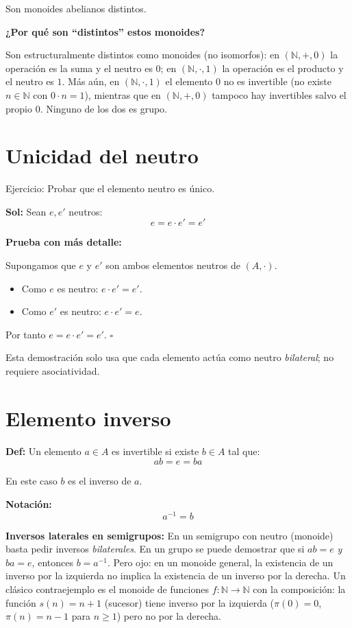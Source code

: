 \documentclass[12pt]{article}
\begin{document}
Son monoides abelianos distintos.

\begin{tcolorbox}[iabox]
\textbf{¿Por qué son ``distintos'' estos monoides?}

Son estructuralmente distintos como monoides (no isomorfos): en $(\mathbb{N},+,0)$ la operación es la suma y el neutro es $0$; en $(\mathbb{N},\cdot,1)$ la operación es el producto y el neutro es $1$. Más aún, en $(\mathbb{N},\cdot,1)$ el elemento $0$ no es invertible (no existe $n\in\mathbb{N}$ con $0\cdot n=1$), mientras que en $(\mathbb{N},+,0)$ tampoco hay invertibles salvo el propio $0$. Ninguno de los dos es grupo.
\end{tcolorbox}

\section*{Unicidad del neutro}

Ejercicio: Probar que el elemento neutro es único.

\textbf{Sol:}
Sean $e,e'$ neutros:
\[
e=e\cdot e'=e'
\]

\begin{tcolorbox}[iabox]
\textbf{Prueba con más detalle:}

Supongamos que $e$ y $e'$ son ambos elementos neutros de $(A,\cdot)$.
\begin{itemize}
  \item Como $e$ es neutro: $e \cdot e' = e'$.
  \item Como $e'$ es neutro: $e \cdot e' = e$.
\end{itemize}
Por tanto $e = e \cdot e' = e'$. \quad$\square$

Esta demostración solo usa que cada elemento actúa como neutro \emph{bilateral}; no requiere asociatividad.
\end{tcolorbox}

\section*{Elemento inverso}

\textbf{Def:} Un elemento $a\in A$ es invertible si existe $b\in A$ tal que:
\[
ab=e=ba
\]

En este caso $b$ es el inverso de $a$.

\textbf{Notación:}
\[
a^{-1}=b
\]

\begin{tcolorbox}[iabox]
\textbf{Inversos laterales en semigrupos:} En un semigrupo con neutro (monoide) basta pedir inversos \emph{bilaterales}. En un grupo se puede demostrar que si $ab=e$ \emph{y} $ba=e$, entonces $b=a^{-1}$. Pero ojo: en un monoide general, la existencia de un inverso por la izquierda no implica la existencia de un inverso por la derecha. Un clásico contraejemplo es el monoide de funciones $f:\mathbb{N}\to\mathbb{N}$ con la composición: la función $s(n)=n+1$ (sucesor) tiene inverso por la izquierda ($\pi(0)=0$, $\pi(n)=n-1$ para $n\geq 1$) pero no por la derecha.
\end{tcolorbox}
\end{document}
